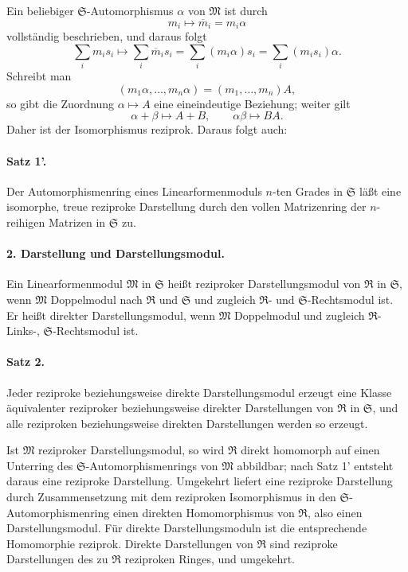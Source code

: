 \documentclass[11pt]{article}
\providecommand{\frR}{\mathfrak R}
\providecommand{\frS}{\mathfrak S}
\providecommand{\frM}{\mathfrak M}
\begin{document}
Ein beliebiger \(\frS\)-Automorphismus \(\alpha\) von \(\frM\) ist durch
\[
        m_i\longmapsto \overline m_i=m_i\alpha
\]
vollständig beschrieben, und daraus folgt
\[
        \sum_i m_i s_i\longmapsto
        \sum_i \overline m_i s_i
        =\sum_i (m_i\alpha)s_i
        =\sum_i (m_i s_i)\alpha.
\]
Schreibt man
\[
        (m_1\alpha,\ldots,m_n\alpha)=(m_1,\ldots,m_n)A,
\]
so gibt die Zuordnung \(\alpha\mapsto A\) eine eineindeutige Beziehung; weiter gilt
\[
        \alpha+\beta\mapsto A+B,\qquad
        \alpha\beta\mapsto BA.
\]
Daher ist der Isomorphismus reziprok. Daraus folgt auch:

\paragraph{Satz 1'.}
Der Automorphismenring eines Linearformenmoduls \(n\)-ten Grades in \(\frS\) läßt eine isomorphe, treue reziproke Darstellung durch den vollen Matrizenring der \(n\)-reihigen Matrizen in \(\frS\) zu.

\paragraph{2. Darstellung und Darstellungsmodul.}
Ein Linearformenmodul \(\frM\) in \(\frS\) heißt reziproker Darstellungsmodul von \(\frR\) in \(\frS\), wenn \(\frM\) Doppelmodul nach \(\frR\) und \(\frS\) und zugleich \(\frR\)- und \(\frS\)-Rechtsmodul ist. Er heißt direkter Darstellungsmodul, wenn \(\frM\) Doppelmodul und zugleich \(\frR\)-Links-, \(\frS\)-Rechtsmodul ist.

\paragraph{Satz 2.}
Jeder reziproke beziehungsweise direkte Darstellungsmodul erzeugt eine Klasse äquivalenter reziproker beziehungsweise direkter Darstellungen von \(\frR\) in \(\frS\), und alle reziproken beziehungsweise direkten Darstellungen werden so erzeugt.

Ist \(\frM\) reziproker Darstellungsmodul, so wird \(\frR\) direkt homomorph auf einen Unterring des \(\frS\)-Automorphismenrings von \(\frM\) abbildbar; nach Satz 1' entsteht daraus eine reziproke Darstellung. Umgekehrt liefert eine reziproke Darstellung durch Zusammensetzung mit dem reziproken Isomorphismus in den \(\frS\)-Automorphismenring einen direkten Homomorphismus von \(\frR\), also einen Darstellungsmodul. Für direkte Darstellungsmoduln ist die entsprechende Homomorphie reziprok. Direkte Darstellungen von \(\frR\) sind reziproke Darstellungen des zu \(\frR\) reziproken Ringes, und umgekehrt.
\end{document}
